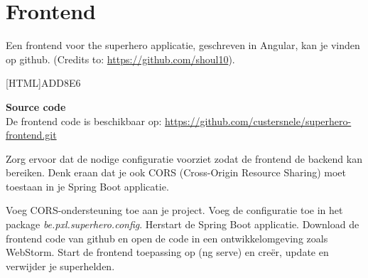 \section{Frontend}

Een frontend voor the superhero applicatie, geschreven in Angular,  kan je vinden op github.  (Credits to: \url{https://github.com/shoul10}).


 [HTML]{ADD8E6}{\parbox{\textwidth}{%
\noindent \textbf{Source code}\\
De frontend code is beschikbaar op: \url{https://github.com/custersnele/superhero-frontend.git}
}}

Zorg ervoor dat de nodige configuratie voorziet zodat de frontend de backend kan bereiken.  Denk eraan dat je ook CORS (Cross-Origin Resource Sharing) moet toestaan in je Spring Boot applicatie.

\begin{oefening}
Voeg CORS-ondersteuning toe aan je project. Voeg de configuratie toe in het package \textit{be.pxl.superhero.config}.  Herstart de Spring Boot applicatie.
Download de frontend code van github en open de code in een ontwikkelomgeving zoals   WebStorm.  Start de frontend toepassing op (ng serve) en cre\"er, update en verwijder je superhelden.
\end{oefening}